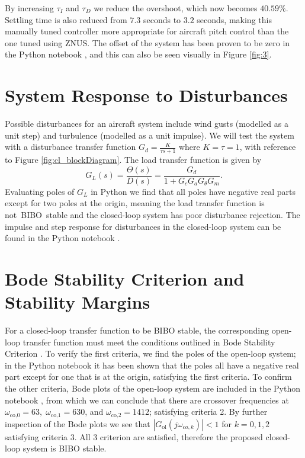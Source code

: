 \documentclass[9pt,a4paper]{article}
\begin{document}
    \noindent By increasing $\tau_I$ and $\tau_D$ we reduce the overshoot, which now becomes $40.59\%$. Settling time is also reduced from $7.3$ seconds to $3.2$ seconds, making this manually tuned controller more appropriate for aircraft pitch control than the one tuned using ZNUS. The offset of the system has been proven to be zero in the Python notebook \cite{python_notebook}, and this can also be seen visually in Figure \ref{fig:3}.

    \section{System Response to Disturbances}
    Possible disturbances for an aircraft system include wind gusts (modelled as a unit step) and turbulence (modelled as a unit impulse). We will test the system with a disturbance transfer function $G_d = \frac{K}{\tau s + 1}$ where $K = \tau = 1$, with reference to Figure \ref{fig:cl_blockDiagram}. The load transfer function is given by
    \begin{equation}
        G_{L}(s) = \frac{\Theta(s)}{D(s)} = \frac{G_d}{1 + G_c G_a G_\theta G_m}.
    \end{equation}
    Evaluating poles of $G_L$ in Python we find that all poles have negative real parts except for two poles at the origin, meaning the load transfer function is not BIBO stable and the closed-loop system has poor disturbance rejection. The impulse and step response for disturbances in the closed-loop system can be found in the Python notebook \cite{python_notebook}.

    \section{Bode Stability Criterion and Stability Margins}
    For a closed-loop transfer function to be BIBO stable, the corresponding open-loop transfer function must meet the conditions outlined in Bode Stability Criterion \cite[Theorem 11.6]{textbook}. To verify the first criteria, we find the poles of the open-loop system; in the Python notebook \cite{python_notebook} it has been shown that the poles all have a negative real part except for one that is at the origin, satisfying the first criteria. To confirm the other criteria, Bode plots of the open-loop system are included in the Python notebook \cite{python_notebook}, from which we can conclude that there are crossover frequencies at $\omega_{\text{co,0}}=63, \; \omega_{\text{co,1}} = 630$, and $\omega_{\text{co,2}} = 1412$; satisfying criteria 2. By further inspection of the Bode plots we see that $|G_{\text{ol}}(j\omega_{co,k})| < 1$ for $k=0, 1, 2$ satisfying criteria 3. All 3 criterion are satisfied, therefore the proposed closed-loop system is BIBO stable. 
    
\end{document}
